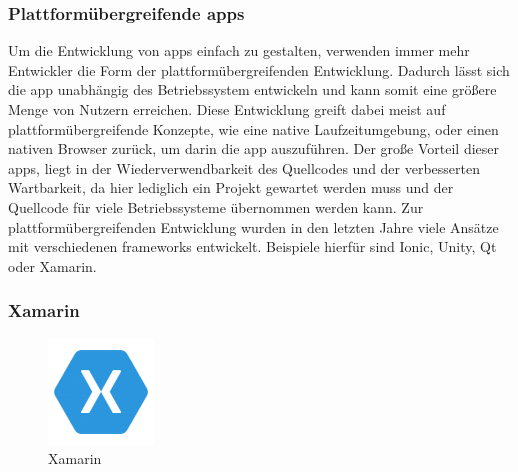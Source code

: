 \subsubsection{Plattformübergreifende \glspl{app}}

Um die Entwicklung von \glspl{app} einfach zu gestalten, verwenden immer mehr Entwickler die Form der plattformübergreifenden Entwicklung. Dadurch lässt sich die \gls{app} unabhängig des Betriebssystem entwickeln und kann somit eine größere Menge von Nutzern erreichen. Diese Entwicklung greift dabei meist auf plattformübergreifende Konzepte, wie eine native Laufzeitumgebung, oder einen nativen Browser zurück, um darin die \gls{app} auszuführen. Der große Vorteil dieser \glspl{app}, liegt in der Wiederverwendbarkeit des Quellcodes und der verbesserten Wartbarkeit, da hier lediglich ein Projekt gewartet werden muss und der Quellcode für viele Betriebssysteme übernommen werden kann. Zur plattformübergreifenden Entwicklung wurden in den letzten Jahre viele Ansätze mit verschiedenen \glspl{framework} entwickelt. Beispiele hierfür sind Ionic, Unity, Qt oder Xamarin.\\
\newpage

\subsubsection{Xamarin}

\begin{figure}
	\begin{center}
		\includegraphics[width=0.25\textwidth]{images/technische_grundlagen/xamarin.png}
	\end{center}
	\caption{Xamarin \cite{Xamarin}}
	\label{fig:xamarin}
\end{figure}

